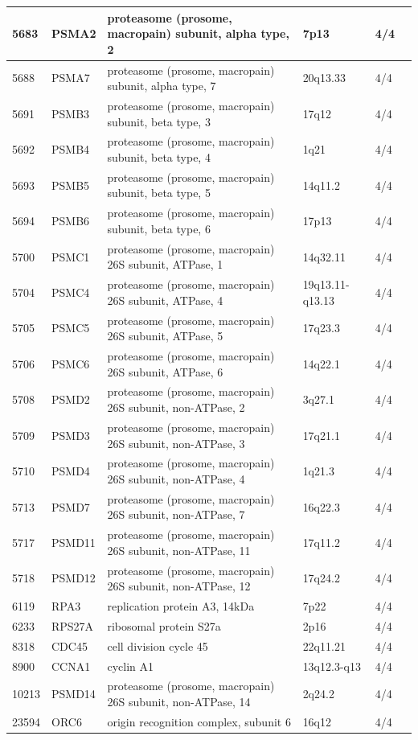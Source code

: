 \documentclass[11pt]{article}
\begin{document}
\begin{table}
{\begin{tabular}{|l|l|l|l|l|l|}
\hline
5683 & PSMA2 & proteasome (prosome, macropain) subunit, alpha type, 2 & 7p13 & 4/4 \\
\hline
5688 & PSMA7 & proteasome (prosome, macropain) subunit, alpha type, 7 & 20q13.33 & 4/4 \\
\hline
5691 & PSMB3 & proteasome (prosome, macropain) subunit, beta type, 3 & 17q12 & 4/4 \\
\hline
5692 & PSMB4 & proteasome (prosome, macropain) subunit, beta type, 4 & 1q21 & 4/4 \\
\hline
5693 & PSMB5 & proteasome (prosome, macropain) subunit, beta type, 5 & 14q11.2 & 4/4 \\
\hline
5694 & PSMB6 & proteasome (prosome, macropain) subunit, beta type, 6 & 17p13 & 4/4 \\
\hline
5700 & PSMC1 & proteasome (prosome, macropain) 26S subunit, ATPase, 1 & 14q32.11 & 4/4 \\
\hline
5704 & PSMC4 & proteasome (prosome, macropain) 26S subunit, ATPase, 4 & 19q13.11-q13.13 & 4/4 \\
\hline
5705 & PSMC5 & proteasome (prosome, macropain) 26S subunit, ATPase, 5 & 17q23.3 & 4/4 \\
\hline
5706 & PSMC6 & proteasome (prosome, macropain) 26S subunit, ATPase, 6 & 14q22.1 & 4/4 \\
\hline
5708 & PSMD2 & proteasome (prosome, macropain) 26S subunit, non-ATPase, 2 & 3q27.1 & 4/4 \\
\hline
5709 & PSMD3 & proteasome (prosome, macropain) 26S subunit, non-ATPase, 3 & 17q21.1 & 4/4 \\
\hline
5710 & PSMD4 & proteasome (prosome, macropain) 26S subunit, non-ATPase, 4 & 1q21.3 & 4/4 \\
\hline
5713 & PSMD7 & proteasome (prosome, macropain) 26S subunit, non-ATPase, 7 & 16q22.3 & 4/4 \\
\hline
5717 & PSMD11 & proteasome (prosome, macropain) 26S subunit, non-ATPase, 11 & 17q11.2 & 4/4 \\
\hline
5718 & PSMD12 & proteasome (prosome, macropain) 26S subunit, non-ATPase, 12 & 17q24.2 & 4/4 \\
\hline
6119 & RPA3 & replication protein A3, 14kDa & 7p22 & 4/4 \\
\hline
6233 & RPS27A & ribosomal protein S27a & 2p16 & 4/4 \\
\hline
8318 & CDC45 & cell division cycle 45 & 22q11.21 & 4/4 \\
\hline
8900 & CCNA1 & cyclin A1 & 13q12.3-q13 & 4/4 \\
\hline
10213 & PSMD14 & proteasome (prosome, macropain) 26S subunit, non-ATPase, 14 & 2q24.2 & 4/4 \\
\hline
23594 & ORC6 & origin recognition complex, subunit 6 & 16q12 & 4/4 \\
\hline
\end{tabular}
}%
\end{table}
\end{document}
